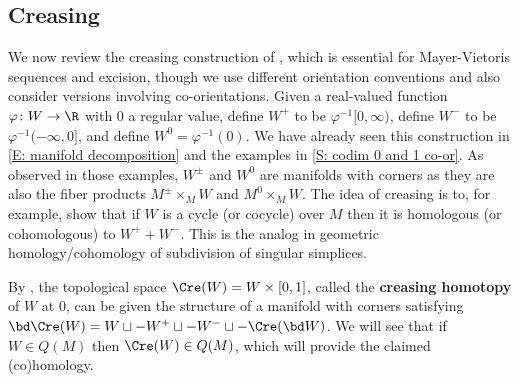 \subsection{Creasing}\label{S: creasing}

We now review the creasing construction of \cite[Section 2.4]{Lipy14}, which is essential for Mayer-Vietoris sequences and excision, though we use different orientation conventions and also consider versions involving co-orientations.
Given a real-valued function $\varphi \colon W \to \R$ with $0$ a regular value,
define $W^+$ to be $\varphi^{-1} [0, \infty)$, define $W^-$ to be $\varphi^{-1} (-\infty, 0]$, and define $W^0 = \varphi^{-1}(0)$.
We have already seen this construction in \cref{E: manifold decomposition} and the examples in \cref{S: codim 0 and 1 co-or}.
As observed in those examples, $W^\pm$ and $W^0$
are manifolds with corners as they are also the fiber products $M^\pm \times_M W$ and $M^0 \times_M W$.
The idea of creasing is to, for example, show that if $W$ is a cycle (or cocycle) over $M$ then it is homologous (or cohomologous) to $W^++W^-$.
This is the analog in geometric homology/cohomology of subdivision of singular simplices.

By \cite[Lemma~9]{Lipy14}, the topological space $\Cre(W) = W \times [0,1]$, called the \textbf{creasing homotopy} of $W$ at $0$, can be given the structure of a manifold with corners satisfying $\bd \Cre(W) = W \sqcup -W^+ \sqcup -W^- \sqcup - \Cre(\bd W)$.
We will see that if $W \in Q(M)$ then $\Cre(W) \in Q(M)$, which will provide the claimed (co)homology.

